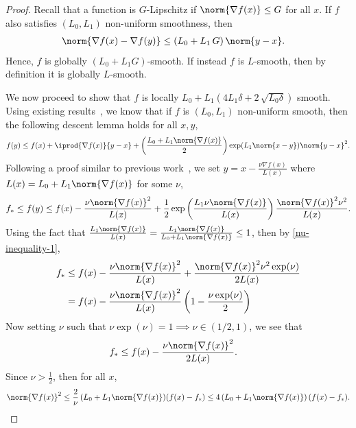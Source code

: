 \documentclass[10pt]{article} %
\begin{document}
\begin{proof}
Recall that a function is $G$-Lipschitz if $\norm{\nabla f(x)} \leq G$ for all $x$. If $f$ also satisfies $(L_{0}, L_{1})$ non-uniform smoothness, then
\begin{align*}
\norm{\nabla f(x) - \nabla f(y)} & \leq (L_0 + L_1 \, G ) \, \norm{y - x}.
\end{align*}
Hence, $f$ is globally $(L_{0} + L_{1}G)$-smooth. If instead $f$ is $L$-smooth, then by definition it is globally $L$-smooth.

We now proceed to show that $f$ is locally $L_{0} + L_{1}(4L_{1}\delta + 2 \, \sqrt{L_{0}\delta})$ smooth. Using existing results~\cite[Theorem 1, Proposition 3.2]{chen2023generalized}, we know that if $f$ is $(L_{0}, L_{1})$ non-uniform smooth, then the following descent lemma holds for all $x, y$,
    \begin{align}
        \label{nu-inequality-1}
        f(y) \leq f(x) + \iprod{\nabla f(x)}{y - x} + \left(\frac{L_{0} + L_{1}\norm{\nabla f(x)}}{2}\right)\exp(L_{1}\norm{x - y})\norm{y - x}^2.
    \end{align}
    Following a proof similar to previous work~\cite[Lemma 2.2]{gorbunov2024methods}, we set $y = x - \frac{\nu\nabla f(x)}{L(x)}$ where $L(x) = L_{0} + L_{1}\norm{\nabla f(x)}$ for some $\nu$,
    \begin{align*}
        f_{*} \leq f(y) \leq f(x) - \frac{\nu\norm{\nabla f(x)}^2}{L(x)} + \frac{1}{2}\exp\left(\frac{L_{1}\nu\norm{\nabla f(x)}}{L(x)}\right)\frac{\norm{\nabla f(x)}^2\nu^2}{L(x)}.
    \end{align*}
    Using the fact that $\frac{L_{1}\norm{\nabla f(x)}}{L(x)} = \frac{L_{1}\norm{\nabla f(x)}}{L_{0} + L_{1}\norm{\nabla f(x)}} \leq 1$, then by \eqref{nu-inequality-1},
    \begin{align*}
        f_{*} &\leq f(x) - \frac{\nu\norm{\nabla f(x)}^2}{L(x)} + \frac{\norm{\nabla f(x)}^2\nu^2\exp(\nu)}{2L(x)} \\
        &= f(x) - \frac{\nu\norm{\nabla f(x)}^2}{L(x)}\left(1 - \frac{\nu \exp(\nu)}{2}\right)
    \end{align*}
    Now setting $\nu$ such that $\nu \exp(\nu) = 1 \implies \nu \in (1/2, 1)$, we see that
    \begin{align*}
        f_{*} &\leq f(x) - \frac{\nu\norm{\nabla f(x)}^2}{2L(x)}.
    \end{align*}    
    Since $\nu > \frac{1}{2}$, then for all $x$,
    \begin{align*}
        \norm{\nabla f(x)}^2 \leq \frac{2}{\nu} \, (L_{0} + L_{1}\norm{\nabla f(x)})(f(x) - f_{*}) \leq 4 \, (L_{0} + L_{1}\norm{\nabla f(x)}) \, (f(x) - f_{*}).

\end{align*}
\end{proof}
\end{document}
